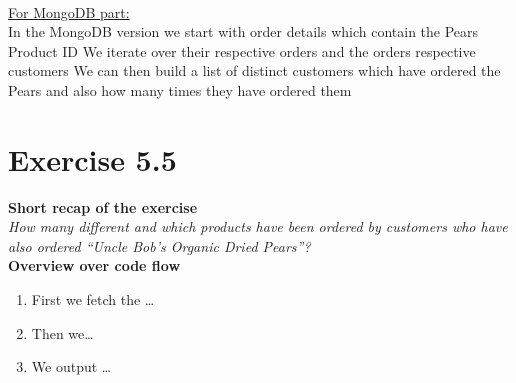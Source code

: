 \documentclass{article}
\begin{document}
~\\
\underline{For MongoDB part:}~\\
In the MongoDB version we start with order details which contain the Pears Product ID
We iterate over their respective orders and the orders respective customers
We can then build a list of distinct customers which have ordered the Pears and also how many times they have ordered them 


\section{Exercise 5.5}
\textbf{Short recap of the exercise}\\
\textit{How many different and which products have been ordered by customers who have also ordered “Uncle Bob’s Organic Dried Pears”?}\\

\textbf{Overview over code flow}\\

\begin{enumerate}
  \item First we fetch the \ldots
  \item Then we\ldots
  \item We output \ldots\\
\end{enumerate}
\end{document}
